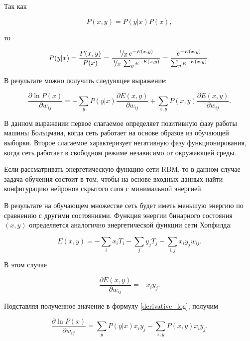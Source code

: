 Так как
	
\begin{equation*}
	P(x,y)=P(y \lvert x)P(x),
\end{equation*}
	
то
	
\begin{equation*}
	P(y \lvert x) = \frac{P(x,y)}{P(x)}=\frac{\slantfrac{1}{Z}e^{-E(x,y)}}{\slantfrac{1}{Z}\sum_y e^{-E(x,y)}}=\frac{e^{-E(x,y)}}{\sum_y e^{-E(x,y)}}.
\end{equation*}
	
В результате можно получить следующее выражение:
	
\begin{equation}
	\label{derivative_log}
	\frac{\partial \ln P(x)}{\partial w_{ij}}=-\sum_y P(y \lvert x)\frac{\partial E(x,y)}{\partial w_{ij}} + \sum_{x,y} P(x,y)\frac{\partial E(x,y)}{\partial w_{ij}}.
\end{equation}
	
В данном выражении первое слагаемое определяет позитивную фазу работы машины Больцмана, когда сеть работает на основе образов из обучающей выборки. Второе слагаемое характеризует негативную фазу функционирования, когда сеть работает в свободном режиме независимо от окружающей среды.

Если рассматривать энергетическую функцию сети RBM, то в данном случае задача обучения состоит в том, чтобы на основе входных данных найти конфигурацию нейронов скрытого слоя с минимальной энергией. 

В результате на обучающем множестве сеть будет иметь меньшую энергию по сравнению с другими состояниями. Функция энергии бинарного состояния $(x,y)$ определяется аналогично энергетической функции сети Хопфилда:
	
\begin{equation}
	E(x,y)=-\sum_i x_iT_i-\sum_j y_jT_j-\sum_{i,j} x_iy_jw_{ij}.
\end{equation}
	
В этом случае
	
\begin{equation*}
	\frac{\partial E(x,y)}{\partial w_{ij}}=-x_iy_j.	
\end{equation*}
	
Подставляя полученное значение в формулу \ref{derivative_log}, получим
	
\begin{equation*}
	\frac{\partial \ln P(x)}{\partial w_{ij}}=\sum_y P(y \lvert x)x_i y_j-\sum_{x,y} P(x,y)x_iy_j.
\end{equation*}
	
